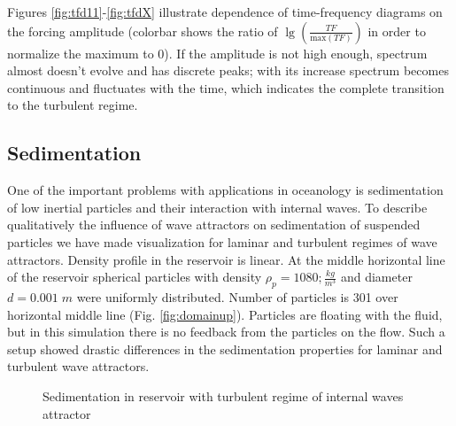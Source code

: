 \documentclass[a4wide,fontsize=12pt]{article}
\begin{document}
Figures \ref{fig:tfd11}-\ref{fig:tfdX} illustrate dependence of time-frequency diagrams on the forcing amplitude (colorbar shows the ratio of $\lg\left(\frac{TF}{\text{max} (TF)}\right)$ in order to normalize the maximum to 0).  If the amplitude is not high enough, spectrum almost doesn't evolve and has discrete peaks; with its increase spectrum becomes continuous and fluctuates with the time, which indicates the complete transition to the turbulent regime.

\subsection{Sedimentation}

One of the important problems with applications in oceanology  is sedimentation of low inertial particles and their interaction with internal waves. To describe qualitatively the influence of wave attractors on sedimentation of suspended particles we have made visualization for laminar and turbulent regimes of wave attractors. Density profile in  the reservoir is linear.
At the middle horizontal line of the reservoir spherical particles with density $\rho_p = 1080;\frac{kg}{m^3}$ and diameter $d=0.001 \; m$ were uniformly distributed.  Number of particles is 301 over horizontal middle line (Fig. \ref{fig:domainup}). Particles are floating with the fluid, but in this simulation there is no feedback from the particles on the flow. Such a setup showed drastic differences in the sedimentation properties for laminar and turbulent wave attractors.

\begin{figure}[h!]
\centering
    \begin{minipage}[t]{0.45\textwidth}
        \centering
        
        \label{fig:turbSed2Da}
    \end{minipage}
    \begin{minipage}[t]{0.45\textwidth}
        \centering
        \label{fig:turbSed2Db}
    \end{minipage}
    \caption{Sedimentation in reservoir with turbulent regime of internal waves attractor}
\end{figure}
\end{document}

